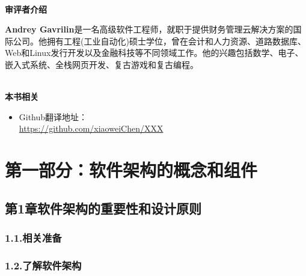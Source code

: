 \documentclass[11pt,a4paper,UTF8]{book}
\begin{document}
	\thispagestyle{empty}
	\hspace*{\fill} \\ %
	\noindent\textbf{审评者介绍}
	
	\textbf{Andrey Gavrilin}是一名高级软件工程师，就职于提供财务管理云解决方案的国际公司。他拥有工程(工业自动化)硕士学位，曾在会计和人力资源、道路数据库、Web和Linux发行开发以及金融科技等不同领域工作。他的兴趣包括数学、电子、嵌入式系统、全栈网页开发、复古游戏和复古编程。
	
	
	\hspace*{\fill} \\ %
	\noindent\textbf{本书相关}
	\begin{itemize}
		\item Github翻译地址：\\\url{https://github.com/xiaoweiChen/XXX}
	\end{itemize}
	\newpage
	
	\pagestyle{empty}
	
	
	\tableofcontents
	\newpage
	
	
	\color{white}
	\section*{第一部分：软件架构的概念和组件}
	\pagecolor{mygray}
	\textbf{}
	\newpage
	\color{black}
	\pagecolor{white}
	
	\subsection*{ 第1章\hspace{0.5cm}软件架构的重要性和设计原则}
	
	
	\subsubsection*{ 1.1.\hspace{0.2cm}相关准备}
	
	
	\subsubsection*{ 1.2.\hspace{0.2cm}了解软件架构}
	
	
\end{document}
